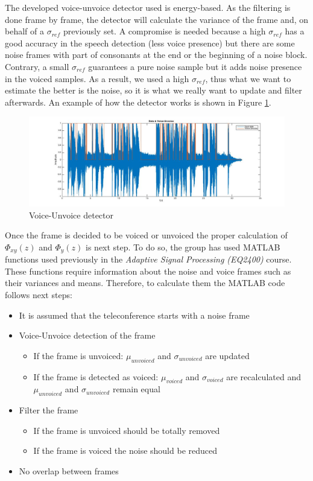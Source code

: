 \documentclass[11pt,a4paper,english]{book}  %
\theoremstyle{definition}  %
\theoremstyle{plain}  %
\theoremstyle{remark}  %
\begin{document}
		The developed voice-unvoice detector used is energy-based. As the filtering is done frame by frame, the detector will calculate the variance of the frame and, on behalf of a $\sigma_{ref}$ previously set. A compromise is needed because a high $\sigma_{ref}$ has a good accuracy in the speech detection (less voice presence) but there are some noise frames with part of consonants at the end or the beginning of a noise block. Contrary, a small $\sigma_{ref}$ guarantees a pure noise sample but it adds noise presence in the voiced samples. As a result, we used a high $\sigma_{ref}$, thus what we want to estimate the better is the noise, so it is what we really want to update and filter afterwards.  An example of how the detector works is shown in Figure \ref{fig:detector}.
		
		\begin{figure}[h]
		\centering
		\includegraphics[width=15cm]{images/theory/highsigma.jpg}
		\caption{Voice-Unvoice detector}
		\label{fig:detector}
		\end{figure}
		
		
		Once the frame is decided to be voiced or unvoiced the proper calculation of $\Phi_{xy}(z)$ and $\Phi_{y}(z)$ is next step. To do so, the group has used MATLAB functions used previously in the \textit{Adaptive Signal Processing (EQ2400)} course. These functions require information about the noise and voice frames such as their variances and means. Therefore, to calculate them the MATLAB code follows next steps:
		
		\begin{itemize}
		\item It is assumed that the teleconference starts with a noise frame
			\item Voice-Unvoice detection of the frame
		\begin{itemize}
			\item If the frame is unvoiced: $\mu_{unvoiced}$ and $\sigma_{unvoiced}$ are updated
			\item If the frame is detected as voiced: $\mu_{voiced}$ and $\sigma_{voiced}$ are recalculated and $\mu_{unvoiced}$ and $\sigma_{unvoiced}$ remain equal
			\end{itemize}
			
		\item Filter the frame
			\begin{itemize}
			\item If the frame is unvoiced should be totally removed
			\item If the frame is voiced the noise should be reduced
			\end{itemize}
			\item No overlap between frames
		\end{itemize}
		
\end{document}
